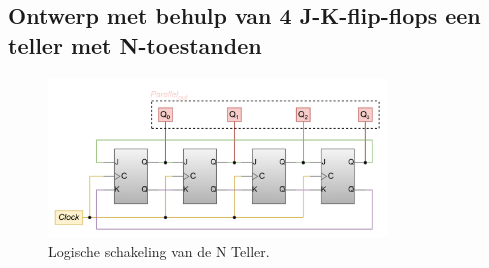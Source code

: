 \documentclass[12pt]{article}
\begin{document}
\subsection{Ontwerp met behulp van 4 J-K-flip-flops een teller met N-toestanden}
\begin{figure}[h]
    \centering
    \includegraphics[width=0.8\textwidth]{ring.png}
    \caption{Logische schakeling van de N Teller.}
    \label{fig:ring}
\end{figure} 
\end{document}

